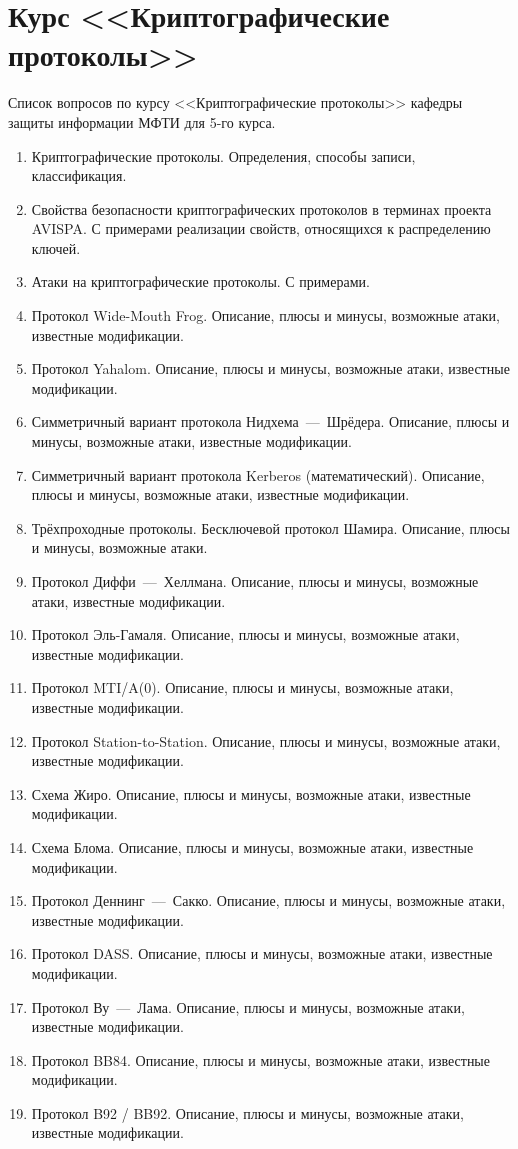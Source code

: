 \section{Курс <<Криптографические протоколы>>}

Список вопросов по курсу <<Криптографические протоколы>> кафедры защиты информации МФТИ для 5-го курса.

\begin{enumerate}
    \item Криптографические протоколы. Определения, способы записи, классификация.
    \item Свойства безопасности криптографических протоколов в терминах проекта AVISPA. С примерами реализации свойств, относящихся к распределению ключей.
    \item Атаки на криптографические протоколы. С примерами.

    \item Протокол Wide-Mouth Frog. Описание, плюсы и минусы, возможные атаки, известные модификации.
    \item Протокол Yahalom. Описание, плюсы и минусы, возможные атаки, известные модификации.
    \item Симметричный вариант протокола Нидхема~---~Шрёдера. Описание, плюсы и минусы, возможные атаки, известные модификации.
    \item Симметричный вариант протокола Kerberos (математический). Описание, плюсы и минусы, возможные атаки, известные модификации.
    \item Трёхпроходные протоколы. Бесключевой протокол Шамира. Описание, плюсы и минусы, возможные атаки.
    \item Протокол Диффи~---~Хеллмана. Описание, плюсы и минусы, возможные атаки, известные модификации.
    \item Протокол Эль-Гамаля. Описание, плюсы и минусы, возможные атаки, известные модификации.
    \item Протокол MTI/A(0). Описание, плюсы и минусы, возможные атаки, известные модификации.
    \item Протокол Station-to-Station. Описание, плюсы и минусы, возможные атаки, известные модификации.
    \item Схема Жиро. Описание, плюсы и минусы, возможные атаки, известные модификации.
    \item Схема Блома. Описание, плюсы и минусы, возможные атаки, известные модификации.
    \item Протокол Деннинг~---~Сакко. Описание, плюсы и минусы, возможные атаки, известные модификации.
    \item Протокол DASS. Описание, плюсы и минусы, возможные атаки, известные модификации.
    \item Протокол Ву~---~Лама. Описание, плюсы и минусы, возможные атаки, известные модификации.
    \item Протокол BB84. Описание, плюсы и минусы, возможные атаки, известные модификации.
    \item Протокол B92 / BB92. Описание, плюсы и минусы, возможные атаки, известные модификации.


\end{enumerate}

